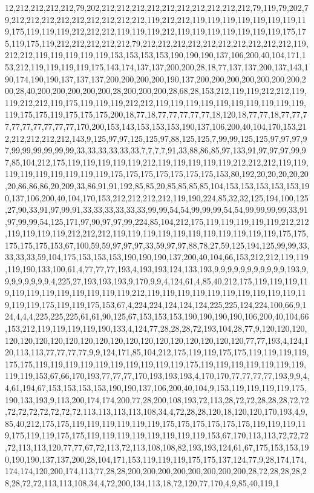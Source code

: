 12,212,212,212,212,79,202,212,212,212,212,212,212,212,212,212,212,79,119,79,202,79,212,212,212,212,212,212,212,212,212,119,212,212,119,119,119,119,119,119,119,119,175,119,119,119,212,212,212,119,119,119,212,119,119,119,119,119,119,119,175,175,119,175,119,212,212,212,212,212,79,212,212,212,212,212,212,212,212,212,212,119,212,212,119,119,119,119,119,153,153,153,153,190,190,190,137,106,200,40,104,171,153,212,119,119,119,119,175,143,174,137,137,200,200,28,18,77,137,137,200,137,143,190,174,190,190,137,137,137,200,200,200,200,190,137,200,200,200,200,200,200,200,200,28,40,200,200,200,200,200,28,200,200,200,28,68,28,153,212,119,119,212,212,119,119,212,212,119,175,119,119,119,212,212,119,119,119,119,119,119,119,119,119,119,119,175,175,119,175,175,175,200,18,77,18,77,77,77,77,77,18,120,18,77,77,18,77,77,77,77,77,77,77,77,77,170,200,153,143,153,153,153,190,137,106,200,40,104,170,153,212,212,212,212,212,143,9,125,97,97,125,125,97,88,125,125,7,99,99,125,125,97,97,97,97,99,99,99,99,99,99,33,33,33,33,33,33,7,7,7,7,91,33,88,86,85,97,133,91,97,97,97,99,97,85,104,212,175,119,119,119,119,119,212,119,119,119,119,119,212,212,212,119,119,119,119,119,119,119,119,119,175,175,175,175,175,175,175,153,80,192,20,20,20,20,20,20,86,86,86,20,209,33,86,91,91,192,85,85,20,85,85,85,85,104,153,153,153,153,153,190,137,106,200,40,104,170,153,212,212,212,212,119,190,224,85,32,32,125,194,100,125,27,90,33,91,97,99,91,33,33,33,33,33,33,99,99,54,54,99,99,99,54,54,99,99,99,99,33,91,97,99,99,54,125,171,97,90,97,97,99,224,85,104,212,175,119,119,119,119,119,212,212,119,119,119,119,212,212,212,119,119,119,119,119,119,119,119,119,119,119,175,175,175,175,175,153,67,100,59,59,97,97,97,33,59,97,97,88,78,27,59,125,194,125,99,99,33,33,33,33,59,104,175,153,153,153,190,190,190,137,200,40,104,66,153,212,212,119,119,119,190,133,100,61,4,77,77,77,193,4,193,193,124,133,193,9,9,9,9,9,9,9,9,9,9,9,193,9,9,9,9,9,9,9,9,4,225,27,193,193,193,9,170,9,9,4,124,61,4,85,40,212,175,119,119,119,119,119,119,119,119,119,119,119,119,212,119,119,119,119,119,119,119,119,119,119,119,119,119,175,119,119,175,153,67,4,224,224,124,124,124,225,225,124,224,100,66,9,124,4,4,4,225,225,225,61,61,90,125,67,153,153,153,190,190,190,190,106,200,40,104,66,153,212,119,119,119,119,190,133,4,124,77,28,28,28,72,193,104,28,77,9,120,120,120,120,120,120,120,120,120,120,120,120,120,120,120,120,120,120,120,77,77,193,4,124,120,113,113,77,77,77,77,9,9,124,171,85,104,212,175,119,119,175,175,119,119,119,119,175,175,119,119,119,119,119,119,119,119,119,119,175,119,119,119,119,119,119,119,119,119,153,67,66,170,193,77,77,77,170,193,193,193,4,170,170,77,77,77,77,193,9,9,4,4,61,194,67,153,153,153,153,190,190,137,106,200,40,104,9,153,119,119,119,119,175,190,133,193,9,113,200,174,174,200,77,28,200,108,193,72,113,28,72,72,28,28,28,72,72,72,72,72,72,72,72,72,113,113,113,113,108,34,4,72,28,28,120,18,120,120,170,193,4,9,85,40,212,175,175,119,119,119,119,119,119,175,175,175,175,175,175,119,119,119,119,175,119,119,175,175,119,119,119,119,119,119,119,119,153,67,170,113,113,72,72,72,72,113,113,120,77,77,67,72,113,72,113,108,108,82,193,193,124,61,67,175,153,153,190,190,190,137,137,200,28,104,171,153,119,119,119,175,175,137,124,77,9,28,174,174,174,174,120,200,174,113,77,28,28,200,200,200,200,200,200,200,200,28,72,28,28,28,28,28,72,72,113,113,108,34,4,72,200,134,113,18,72,120,77,170,4,9,85,40,119,1